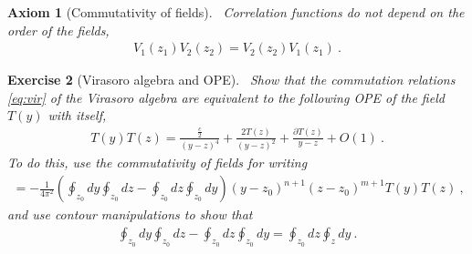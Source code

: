 \documentclass[12pt, a4paper]{article}
\theoremstyle{break}
\newtheorem{exo}{Exercise}[section]
\newtheorem{hyp}[exo]{Axiom}
\begin{document}
\begin{hyp}[Commutativity of fields]
 ~\label{hyp:ass}
 Correlation functions do not depend on the order of the fields,
 \begin{align}
  V_1(z_1) V_2(z_2) = V_2(z_2)V_1(z_1)\ .
 \end{align}
\end{hyp}

\begin{exo}[Virasoro algebra and OPE] 
~\label{exott}
Show that the commutation relations \eqref{eq:vir} of the Virasoro algebra are equivalent to the following OPE of the field $T(y)$ with itself,
\begin{align}
 T(y)T(z) = \frac{\frac{c}{2}}{(y-z)^4} + \frac{2T(z)}{(y-z)^2} + \frac{\partial T(z)}{y-z} + O(1)\ .
\label{tt}
\end{align}
To do this, use the commutativity of fields for writing
\begin{align}
 [L_n^{(z_0)},L_m^{(z_0)}] = -\frac{1}{4\pi^2} \left(\oint_{z_0} dy \oint_{z_0} dz - \oint_{z_0} dz \oint_{z_0} dy\right) (y-z_0)^{n+1}(z-z_0)^{m+1} T(y)T(z)\ ,
 \label{lzlz}
\end{align}
and use contour manipulations to show that 
\begin{align}
 \oint_{z_0} dy \oint_{z_0} dz - \oint_{z_0} dz \oint_{z_0} dy = \oint_{z_0} dz \oint_z dy\ .
\end{align}
\end{exo}
\end{document}

